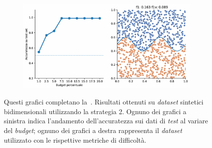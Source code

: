 \begin{appendices}
\begin{figure}[ht]
\begin{subfigure}{.8\textwidth}
    \end{subfigure}%
    \hfill
    \begin{subfigure}{.8\textwidth}
        \centering
        \includegraphics[width=\textwidth]{img/2d_v2/11.pdf}
    \end{subfigure}
    \caption[]{Questi grafici completano la~. Risultati ottenuti su \emph{dataset} sintetici bidimensionali utilizzando la strategia 2. Ognuno dei grafici a sinistra indica l'andamento dell'accuratezza sui dati di \emph{test} al variare del \emph{budget}; ognuno dei grafici a destra rappresenta il \emph{dataset} utilizzato con le rispettive metriche di difficoltà.}
\end{figure}



\end{appendices}
